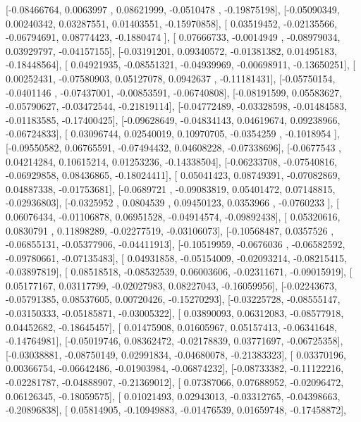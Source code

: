 \documentclass{article}
\begin{document}
       [-0.08466764,  0.0063997 ,  0.08621999, -0.0510478 , -0.19875198],
       [-0.05090349,  0.00240342,  0.03287551,  0.01403551, -0.15970858],
       [ 0.03519452, -0.02135566, -0.06794691,  0.08774423, -0.1880474 ],
       [ 0.07666733, -0.0014949 , -0.08979034,  0.03929797, -0.04157155],
       [-0.03191201,  0.09340572, -0.01381382,  0.01495183, -0.18448564],
       [ 0.04921935, -0.08551321, -0.04939969, -0.00698911, -0.13650251],
       [ 0.00252431, -0.07580903,  0.05127078,  0.0942637 , -0.11181431],
       [-0.05750154, -0.0401146 , -0.07437001, -0.00853591, -0.06740808],
       [-0.08191599,  0.05583627, -0.05790627, -0.03472544, -0.21819114],
       [-0.04772489, -0.03328598, -0.01484583, -0.01183585, -0.17400425],
       [-0.09628649, -0.04834143,  0.04619674,  0.09238966, -0.06724833],
       [ 0.03096744,  0.02540019,  0.10970705, -0.0354259 , -0.1018954 ],
       [-0.09550582,  0.06765591, -0.07494432,  0.04608228, -0.07338696],
       [-0.0677543 ,  0.04214284,  0.10615214,  0.01253236, -0.14338504],
       [-0.06233708, -0.07540816, -0.06929858,  0.08436865, -0.18024411],
       [ 0.05041423,  0.08749391, -0.07082869,  0.04887338, -0.01753681],
       [-0.0689721 , -0.09083819,  0.05401472,  0.07148815, -0.02936803],
       [-0.0325952 ,  0.0804539 ,  0.09450123,  0.0353966 , -0.0760233 ],
       [ 0.06076434, -0.01106878,  0.06951528, -0.04914574, -0.09892438],
       [ 0.05320616,  0.0830791 ,  0.11898289, -0.02277519, -0.03106073],
       [-0.10568487,  0.0357526 , -0.06855131, -0.05377906, -0.04411913],
       [-0.10519959, -0.0676036 , -0.06582592, -0.09780661, -0.07135483],
       [ 0.04931858, -0.05154009, -0.02093214, -0.08215415, -0.03897819],
       [ 0.08518518, -0.08532539,  0.06003606, -0.02311671, -0.09015919],
       [ 0.05177167,  0.03117799, -0.02027983,  0.08227043, -0.16059956],
       [-0.02243673, -0.05791385,  0.08537605,  0.00720426, -0.15270293],
       [-0.03225728, -0.08555147, -0.03150333, -0.05185871, -0.03005322],
       [ 0.03890093,  0.06312083, -0.08577918,  0.04452682, -0.18645457],
       [ 0.01475908,  0.01605967,  0.05157413, -0.06341648, -0.14764981],
       [-0.05019746,  0.08362472, -0.02178839,  0.03771697, -0.06725358],
       [-0.03038881, -0.08750149,  0.02991834, -0.04680078, -0.21383323],
       [ 0.03370196,  0.00366754, -0.06642486, -0.01903984, -0.06874232],
       [-0.08733382, -0.11122216, -0.02281787, -0.04888907, -0.21369012],
       [ 0.07387066,  0.07688952, -0.02096472,  0.06126345, -0.18059575],
       [ 0.01021493,  0.02943013, -0.03312765, -0.04398663, -0.20896838],
       [ 0.05814905, -0.10949883, -0.01476539,  0.01659748, -0.17458872],
\end{document}

